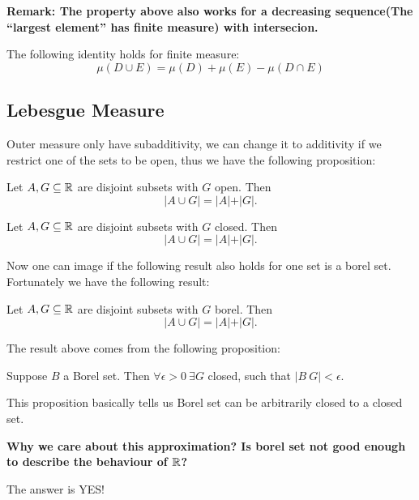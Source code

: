 \documentclass[11pt]{article}
\begin{document}
\textbf{Remark: The property above also works for a decreasing sequence(The ``largest element'' has finite measure) with intersecion.}

\begin{proposition}
The following identity holds for finite measure:
\[
\mu(D\cup E) = \mu(D) + \mu(E) - \mu(D\cap E)
\]
\end{proposition}
\subsection{Lebesgue Measure}
\label{sec:org1d92167}
Outer measure only have subadditivity, we can change it to additivity if we restrict one of the sets to be open, thus we have the following proposition:

\begin{proposition}
Let \(A,G \subseteq \mathbb{R}\) are disjoint subsets with \(G\) open. Then
\[
\vert A \cup G \vert = \vert A \vert + \vert G \vert.
\]
\end{proposition}

\begin{proposition}
Let \(A,G \subseteq \mathbb{R}\) are disjoint subsets with \(G\) closed. Then
\[
\vert A \cup G \vert = \vert A \vert + \vert G \vert.
\]
\end{proposition}

Now one can image if the following result also holds for one set is a borel set. Fortunately we have the following result:
\begin{proposition}
Let \(A,G \subseteq \mathbb{R}\) are disjoint subsets with \(G\) borel. Then
\[
\vert A \cup G \vert = \vert A \vert + \vert G \vert.
\]
\end{proposition}

The result above comes from the following proposition:
\begin{proposition}
Suppose \(B\) a Borel set. Then \(\forall \epsilon > 0 \ \exists G\) closed, such that \(\vert B \ G\vert < \epsilon\).
\end{proposition}

This proposition basically tells us Borel set can be arbitrarily closed to a closed set.

\textbf{Why we care about this approximation? Is borel set not good enough to describe the behaviour of \(\mathbb{R}\)?}

The answer is YES!
\end{document}
